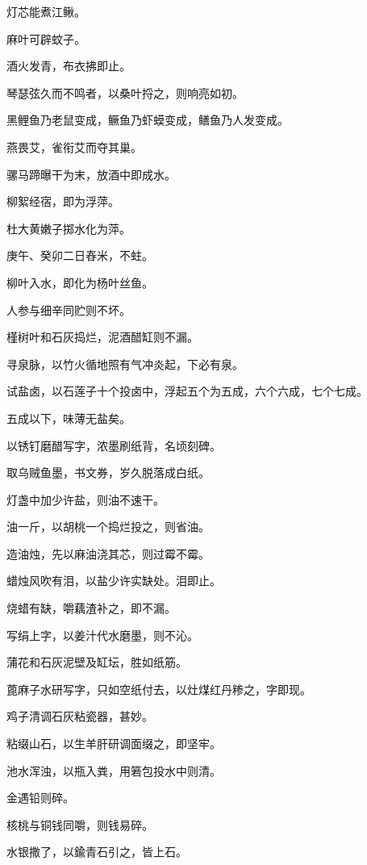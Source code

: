 \documentclass[a4paper,12pt,UTF8,twoside]{ctexbook}
\begin{document}
    灯芯能煮江鳅。
    
    麻叶可辟蚊子。
    
    酒火发青，布衣拂即止。
    
    琴瑟弦久而不鸣者，以桑叶捋之，则响亮如初。
    
    黑鲤鱼乃老鼠变成，鳜鱼乃虾蟆变成，鳝鱼乃人发变成。
    
    燕畏艾，雀衔艾而夺其巢。
    
    骡马蹄曝干为末，放酒中即成水。
    
    柳絮经宿，即为浮萍。
    
    杜大黄嫩子掷水化为萍。
    
    庚午、癸卯二日舂米，不蛀。
    
    柳叶入水，即化为杨叶丝鱼。
    
    人参与细辛同贮则不坏。
    
    槿树叶和石灰捣烂，泥酒醋缸则不漏。
    
    寻泉脉，以竹火循地照有气冲炎起，下必有泉。
    
    试盐卤，以石莲子十个投卤中，浮起五个为五成，六个六成，七个七成。
    
    五成以下，味薄无盐矣。
    
    以锈钉磨醋写字，浓墨刷纸背，名顷刻碑。
    
    取乌贼鱼墨，书文券，岁久脱落成白纸。
    
    灯盏中加少许盐，则油不速干。
    
    油一斤，以胡桃一个捣烂投之，则省油。
    
    造油烛，先以麻油浇其芯，则过霉不霉。
    
    蜡烛风吹有泪，以盐少许实缺处。泪即止。
    
    烧蜡有缺，嚼藕渣补之，即不漏。
    
    写绢上字，以姜汁代水磨墨，则不沁。
    
    蒲花和石灰泥壁及缸坛，胜如纸筋。
    
    蓖麻子水研写字，只如空纸付去，以灶煤红丹糁之，字即现。
    
    鸡子清调石灰粘瓷器，甚妙。
    
    粘缀山石，以生羊肝研调面缀之，即坚牢。
    
    池水浑浊，以瓶入粪，用箬包投水中则清。
    
    金遇铅则碎。
    
    核桃与铜钱同嚼，则钱易碎。
    
    水银撒了，以鍮青石引之，皆上石。
    
\end{document}
